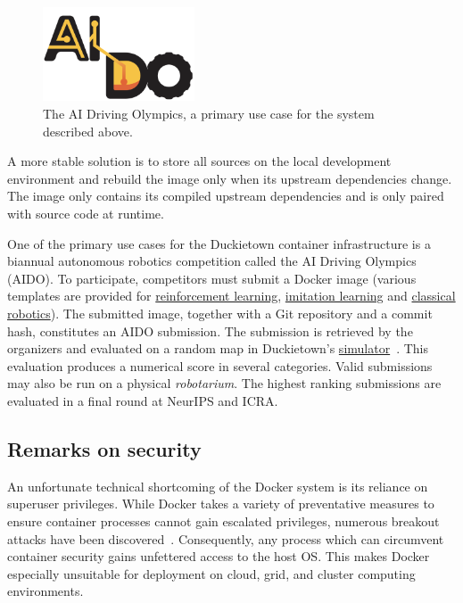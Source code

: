 \documentclass[12pt,initial,twoside,maitrise]{dms}
\numberwithin{equation}{section}
\numberwithin{table}{chapter}
\numberwithin{figure}{chapter}
\begin{document}
\begin{figure}
    \includegraphics[width=0.40\textwidth]{../figures/aido_logo.png}
    \caption{The AI Driving Olympics, a primary use case for the system described above.}
    \label{fig:aido_logo}
\end{figure}

A more stable solution is to store all sources on the local development environment and rebuild the image only when its upstream dependencies change. The image only contains its compiled upstream dependencies and is only paired with source code at runtime.

One of the primary use cases for the Duckietown container infrastructure is a biannual autonomous robotics competition called the AI Driving Olympics~\citep{aido2018} (AIDO). To participate, competitors must submit a Docker image (various templates are provided for \href{https://github.com/duckietown/challenge-aido_LF-baseline-RL-sim-pytorch}{reinforcement learning}, \href{https://github.com/duckietown/challenge-aido_LF-baseline-IL-logs-tensorflow}{imitation learning} and \href{https://github.com/duckietown/challenge-aido_LF-template-ros}{classical robotics}). The submitted image, together with a Git repository and a commit hash, constitutes an AIDO submission. The submission is retrieved by the organizers and evaluated on a random map in Duckietown's \href{https://github.com/duckietown/gym-duckietown}{simulator}~\citep{gym_duckietown}. This evaluation produces a numerical score in several categories. Valid submissions may also be run on a physical \textit{robotarium}. The highest ranking submissions are evaluated in a final round at NeurIPS and ICRA.

\subsection{Remarks on security}

An unfortunate technical shortcoming of the Docker system is its reliance on superuser privileges. While Docker takes a variety of preventative measures to ensure container processes cannot gain escalated privileges, numerous breakout attacks have been discovered~\citep{martin2018docker}. Consequently, any process which can circumvent container security gains unfettered access to the host OS. This makes Docker especially unsuitable for deployment on cloud, grid, and cluster computing environments.
\end{document}
